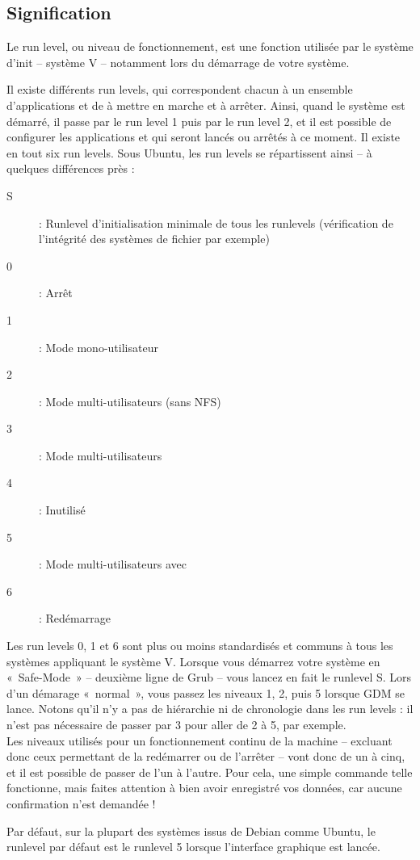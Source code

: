 \subsection{Signification}
Le run level, ou niveau de fonctionnement, est une fonction utilisée par le système d'init -- système V -- notamment lors du démarrage de votre système.\par
Il existe différents run levels, qui correspondent chacun à un ensemble d'applications et de  à mettre en marche et à arrêter. Ainsi, quand le système est démarré, il passe par le run level 1 puis par le run level 2, et il est possible de configurer les applications et  qui seront lancés ou arrêtés à ce moment. Il existe en tout six run levels. Sous Ubuntu, les run levels se répartissent ainsi -- à quelques différences près  :
\begin{description}
\item[S] : Runlevel d'initialisation minimale de tous les runlevels (vérification de l'intégrité des systèmes de fichier par exemple) 
\item[0] : Arrêt 
\item[1] : Mode mono-utilisateur 
\item[2] : Mode multi-utilisateurs (sans NFS) 
\item[3] : Mode multi-utilisateurs 
\item[4] : Inutilisé 
\item[5] : Mode multi-utilisateurs avec 
\item[6] : Redémarrage 
\end{description}
Les run levels 0, 1 et 6 sont plus ou moins standardisés et communs à tous les systèmes appliquant le système V. Lorsque vous démarrez votre système en «~Safe-Mode~» -- deuxième ligne de Grub -- vous lancez en fait le runlevel S. Lors d'un démarage «~normal~», vous passez les niveaux 1, 2, puis 5 lorsque GDM se lance. Notons qu'il n'y a pas de hiérarchie ni de chronologie dans les run levels : il n'est pas nécessaire de passer par 3 pour aller de 2 à 5, par exemple.\\
Les niveaux utilisés pour un fonctionnement continu de la machine -- excluant donc ceux permettant de la redémarrer ou de l'arrêter -- vont donc de un à cinq, et il est possible de passer de l'un à l'autre. Pour cela, une simple commande telle  fonctionne, mais faites attention à bien avoir enregistré vos données, car aucune confirmation n'est demandée !\par
Par défaut, sur la plupart des systèmes issus de Debian comme Ubuntu, le runlevel par défaut est le runlevel 5 lorsque l'interface graphique est lancée.
